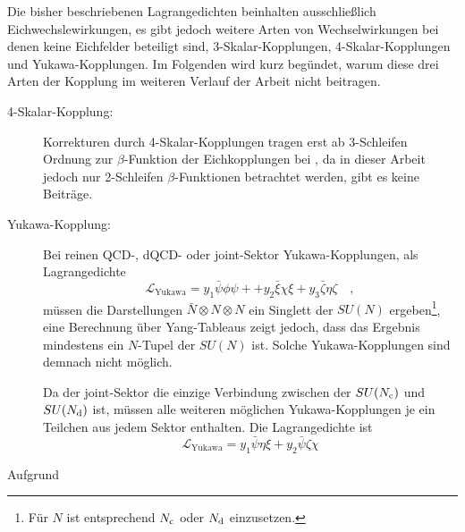     Die bisher beschriebenen Lagrangedichten beinhalten ausschließlich 
    Eichwechslewirkungen, es gibt jedoch weitere Arten von Wechselwirkungen 
    bei denen keine Eichfelder beteiligt sind, 3-Skalar-Kopplungen, 
    4-Skalar-Kopplungen und Yukawa-Kopplungen. Im Folgenden wird kurz begündet, 
    warum diese drei Arten der Kopplung im weiteren Verlauf der Arbeit nicht 
    beitragen.
    \begin{description}
     \item[4-Skalar-Kopplung:]
    Korrekturen durch 
    4-Skalar-Kopplungen tragen erst ab 3-Schleifen Ordnung zur $\beta$-Funktion 
    der Eichkopplungen bei \cite{quartic_scalar}, da in dieser Arbeit jedoch 
    nur 2-Schleifen $\beta$-Funktionen betrachtet werden, gibt es keine 
    Beiträge. 
      \item[Yukawa-Kopplung:]
    Bei reinen QCD-, dQCD- oder joint-Sektor Yukawa-Kopplungen, als 
    Lagrangedichte
    \begin{equation}
     \mathcal{L}_\text{Yukawa}= y_1 \bar{\psi} \phi \psi +
     +y_2 \bar{\xi} \chi \xi + y_3 \bar{\zeta} \eta \zeta 
     \quad ,
    \end{equation}
    müssen die Darstellungen $\bar{N}\otimes N \otimes N$ ein Singlett der 
    $SU(N)$ ergeben\footnote{Für $N$ ist entsprechend $N_\text{c}$ oder $N_\text{d}$ 
    einzusetzen.}, eine Berechnung über Yang-Tableaus zeigt jedoch, dass das 
    Ergebnis mindestens ein $N$-Tupel der $SU(N)$ ist. Solche 
    Yukawa-Kopplungen sind demnach nicht möglich.
    
    Da der joint-Sektor die einzige Verbindung zwischen der $SU(N_\text{c})$ und 
    $SU(N_\text{d})$ ist, müssen alle weiteren möglichen Yukawa-Kopplungen je ein 
    Teilchen aus jedem Sektor enthalten. Die Lagrangedichte ist 
    \begin{equation}
     \mathcal{L}_\text{Yukawa}=y_1 \bar{\psi} \eta \xi + 
     y_2 \bar{\psi} \zeta \chi
    \end{equation}

    
    
    
    \end{description}
    
    
    
    
  Aufgrund\cite{Ade:2015xua}